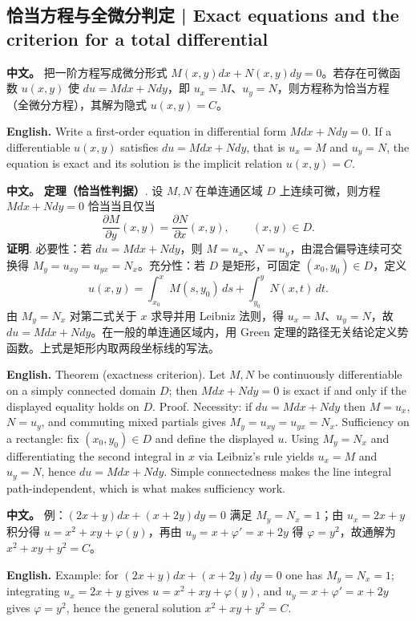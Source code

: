 \documentclass[UTF8,11pt,a4paper]{ctexart}
\newcommand{\APS}[2]{\par\noindent\textbf{中文。} #1\par\noindent\textbf{English.} #2\par}
\begin{document}
\subsection{恰当方程与全微分判定 | Exact equations and the criterion for a total differential}
\APS{把一阶方程写成微分形式 $M(x,y)dx+N(x,y)dy=0$。若存在可微函数 $u(x,y)$ 使 $du=Mdx+Ndy$，即 $u_x=M$、$u_y=N$，则方程称为恰当方程（全微分方程），其解为隐式 $u(x,y)=C$。}{Write a first-order equation in differential form $Mdx+Ndy=0$. If a differentiable $u(x,y)$ satisfies $du=Mdx+Ndy$, that is $u_x=M$ and $u_y=N$, the equation is exact and its solution is the implicit relation $u(x,y)=C$.}
\APS{\textbf{定理（恰当性判据）}. 设 $M,N$ 在单连通区域 $D$ 上连续可微，则方程 $Mdx+Ndy=0$ 恰当当且仅当
\[
\frac{\partial M}{\partial y}(x,y)=\frac{\partial N}{\partial x}(x,y),\qquad (x,y)\in D .
\]
\textbf{证明}. 必要性：若 $du=Mdx+Ndy$，则 $M=u_x$、$N=u_y$，由混合偏导连续可交换得 $M_y=u_{xy}=u_{yx}=N_x$。充分性：若 $D$ 是矩形，可固定 $(x_0,y_0)\in D$，定义
\[
u(x,y)=\int_{x_0}^{x}M(s,y_0)\,ds+\int_{y_0}^{y}N(x,t)\,dt .
\]
由 $M_y=N_x$ 对第二式关于 $x$ 求导并用 Leibniz 法则，得 $u_x=M$、$u_y=N$，故 $du=Mdx+Ndy$。在一般的单连通区域内，用 Green 定理的路径无关结论定义势函数。上式是矩形内取两段坐标线的写法。}{Theorem (exactness criterion). Let $M,N$ be continuously differentiable on a simply connected domain $D$; then $Mdx+Ndy=0$ is exact if and only if the displayed equality holds on $D$. Proof. Necessity: if $du=Mdx+Ndy$ then $M=u_x$, $N=u_y$, and commuting mixed partials gives $M_y=u_{xy}=u_{yx}=N_x$. Sufficiency on a rectangle: fix $(x_0,y_0)\in D$ and define the displayed $u$. Using $M_y=N_x$ and differentiating the second integral in $x$ via Leibniz's rule yields $u_x=M$ and $u_y=N$, hence $du=Mdx+Ndy$. Simple connectedness makes the line integral path-independent, which is what makes sufficiency work.}
\APS{例：$(2x+y)dx+(x+2y)dy=0$ 满足 $M_y=N_x=1$；由 $u_x=2x+y$ 积分得 $u=x^2+xy+\varphi(y)$，再由 $u_y=x+\varphi'=x+2y$ 得 $\varphi=y^2$，故通解为 $x^2+xy+y^2=C$。}{Example: for $(2x+y)dx+(x+2y)dy=0$ one has $M_y=N_x=1$; integrating $u_x=2x+y$ gives $u=x^2+xy+\varphi(y)$, and $u_y=x+\varphi'=x+2y$ gives $\varphi=y^2$, hence the general solution $x^2+xy+y^2=C$.}
\end{document}
